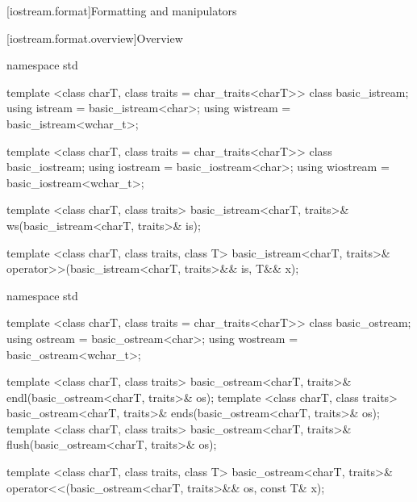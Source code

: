 [iostream.format]{Formatting and manipulators}

[iostream.format.overview]{Overview}

%

\begin{codeblock}
namespace std {
  template <class charT, class traits = char_traits<charT>>
    class basic_istream;
  using istream  = basic_istream<char>;
  using wistream = basic_istream<wchar_t>;

  template <class charT, class traits = char_traits<charT>>
    class basic_iostream;
  using iostream  = basic_iostream<char>;
  using wiostream = basic_iostream<wchar_t>;

  template <class charT, class traits>
    basic_istream<charT, traits>& ws(basic_istream<charT, traits>& is);

  template <class charT, class traits, class T>
    basic_istream<charT, traits>&
    operator>>(basic_istream<charT, traits>&& is, T&& x);
}
\end{codeblock}

%
%
%
%

%

\begin{codeblock}
namespace std {
  template <class charT, class traits = char_traits<charT>>
    class basic_ostream;
  using ostream  = basic_ostream<char>;
  using wostream = basic_ostream<wchar_t>;

  template <class charT, class traits>
    basic_ostream<charT, traits>& endl(basic_ostream<charT, traits>& os);
  template <class charT, class traits>
    basic_ostream<charT, traits>& ends(basic_ostream<charT, traits>& os);
  template <class charT, class traits>
    basic_ostream<charT, traits>& flush(basic_ostream<charT, traits>& os);

  template <class charT, class traits, class T>
    basic_ostream<charT, traits>&
    operator<<(basic_ostream<charT, traits>&& os, const T& x);
}
\end{codeblock}

%
%
%
%

